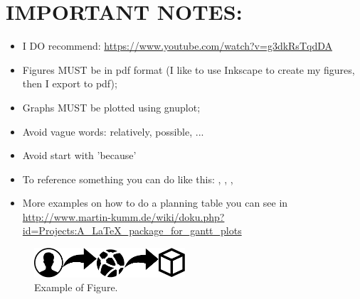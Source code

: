 \newpage
\section*{IMPORTANT NOTES:}
\begin{itemize}
	\item I DO recommend: \url{https://www.youtube.com/watch?v=g3dkRsTqdDA}
	\item Figures MUST be in pdf format (I like to use Inkscape to create my figures, then I export to pdf);
	\item Graphs MUST be plotted using gnuplot; 
	\item Avoid vague words: relatively, possible, ... 
	\item Avoid start with 'because'
	\item To reference something you can do like this: \cite{justyna2015SBRC}, \cite{kerkers2014aims}, \cite{jjsantanna2015IM2,jjsantanna2015IM1}, \cite{santanna2013aims} 
	\item More examples on how to do a planning table you can see in \url{http://www.martin-kumm.de/wiki/doku.php?id=Projects:A_LaTeX_package_for_gantt_plots}
\end{itemize}

\begin{figure}[h!]
	\label{fig:approach}
	\centering
	\includegraphics[width=0.5\textwidth]{figures/example.pdf}
	\caption{Example of Figure.}
\end{figure}